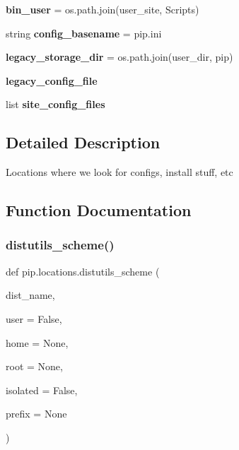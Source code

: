 \begin{DoxyCompactItemize}
{\bfseries bin\+\_\+user} = os.\+path.\+join(user\+\_\+site, \textquotesingle{}Scripts\textquotesingle{})
\item 
\mbox{\label{namespacepip_1_1locations_a86923a18ee844d0b9d52973b2e169900}} 
string {\bfseries config\+\_\+basename} = \textquotesingle{}pip.\+ini\textquotesingle{}
\item 
\mbox{\label{namespacepip_1_1locations_a233e8671fa82bb356acf8db6be17c273}} 
{\bfseries legacy\+\_\+storage\+\_\+dir} = os.\+path.\+join(user\+\_\+dir, \textquotesingle{}pip\textquotesingle{})
\item 
{\bfseries legacy\+\_\+config\+\_\+file}
\item 
list {\bfseries site\+\_\+config\+\_\+files}
\end{DoxyCompactItemize}


\subsection{Detailed Description}
\begin{DoxyVerb}Locations where we look for configs, install stuff, etc\end{DoxyVerb}
 

\subsection{Function Documentation}
\mbox{\label{namespacepip_1_1locations_a749771d21bde6287da42c380135c5b06}} 
\subsubsection{\texorpdfstring{distutils\+\_\+scheme()}{distutils\_scheme()}}
{\footnotesize\ttfamily def pip.\+locations.\+distutils\+\_\+scheme (\begin{DoxyParamCaption}\item[{}]{dist\+\_\+name,  }\item[{}]{user = {\ttfamily False},  }\item[{}]{home = {\ttfamily None},  }\item[{}]{root = {\ttfamily None},  }\item[{}]{isolated = {\ttfamily False},  }\item[{}]{prefix = {\ttfamily None} }\end{DoxyParamCaption})}

